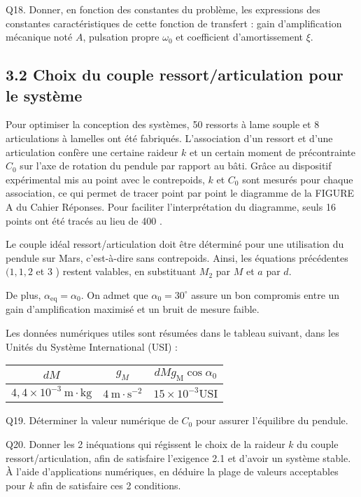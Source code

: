 {Q18. Donner, en fonction des constantes du problème, les expressions des constantes caractéristiques de cette fonction de transfert : gain d'amplification mécanique noté $A$, pulsation propre $\omega_{0}$ et coefficient d'amortissement $\xi$.

\subsection*{3.2 Choix du couple ressort/articulation pour le système}
Pour optimiser la conception des systèmes, 50 ressorts à lame souple et 8 articulations à lamelles ont été fabriqués. L'association d'un ressort et d'une articulation confère une certaine raideur $k$ et un certain moment de précontrainte $C_{0}$ sur l'axe de rotation du pendule par rapport au bâti. Grâce au dispositif expérimental mis au point avec le contrepoids, $k$ et $C_{0}$ sont mesurés pour chaque association, ce qui permet de tracer point par point le diagramme de la FIGURE A du Cahier Réponses. Pour faciliter l'interprétation du diagramme, seuls 16 points ont été tracés au lieu de 400 .

Le couple idéal ressort/articulation doit être déterminé pour une utilisation du pendule sur Mars, c'est-à-dire sans contrepoids. Ainsi, les équations précédentes $(1,1,2$ et 3 ) restent valables, en substituant $M_{2}$ par $M$ et $a$ par $d$.

De plus, $\alpha_{\mathrm{eq}}=\alpha_{0}$. On admet que $\alpha_{0}=30^{\circ}$ assure un bon compromis entre un gain d'amplification maximisé et un bruit de mesure faible.

Les données numériques utiles sont résumées dans le tableau suivant, dans les Unités du Système International (USI) :

\begin{center}
\begin{tabular}{|c|c|c|}
\hline
$d M$ & $g_{M}$ & $d M g_{\mathrm{M}} \cos \alpha_{0}$ \\
\hline
$4,4 \times 10^{-3} \mathrm{~m} \cdot \mathrm{kg}$ & $4 \mathrm{~m} \cdot \mathrm{s}^{-2}$ & $15 \times 10^{-3} \mathrm{USI}$ \\
\hline
\end{tabular}
\end{center}

Q19. Déterminer la valeur numérique de $C_{0}$ pour assurer l'équilibre du pendule.

Q20. Donner les 2 inéquations qui régissent le choix de la raideur $k$ du couple ressort/articulation, afin de satisfaire l'exigence 2.1 et d'avoir un système stable. À l'aide d'applications numériques, en déduire la plage de valeurs acceptables pour $k$ afin de satisfaire ces 2 conditions.

}
